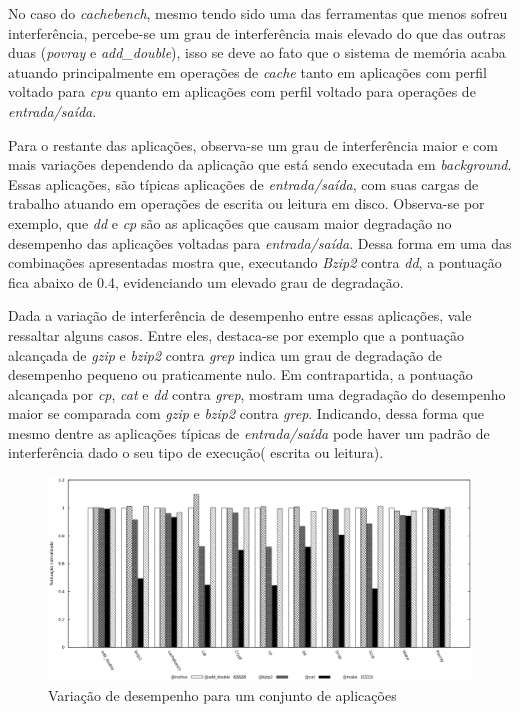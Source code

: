 No caso do \textit{cachebench}, mesmo tendo sido uma das ferramentas que menos sofreu interferência, percebe-se um grau de interferência mais elevado do que das outras duas (\textit{povray} e \textit{add\_double}), isso se deve ao fato que o sistema de memória acaba atuando principalmente em operações de \textit{cache} tanto em aplicações com perfil voltado para \textit{cpu} quanto em aplicações com perfil voltado para operações de \textit{entrada/saída}.

Para o restante das aplicações, observa-se um grau de interferência maior e com mais variações dependendo da aplicação que está sendo executada em \textit{background}. Essas aplicações, são típicas aplicações de \textit{entrada/saída}, com suas cargas de trabalho atuando em operações de escrita ou leitura em disco. Observa-se por exemplo, que \textit{dd} e \textit{cp} são as aplicações que causam maior degradação no desempenho das aplicações voltadas para \textit{entrada/saída}. Dessa forma  em uma das combinações apresentadas mostra que, executando \textit{Bzip2} contra \textit{dd}, a pontuação fica abaixo de 0.4, evidenciando um elevado grau de degradação.

Dada a variação de interferência de desempenho entre essas aplicações, vale ressaltar alguns casos. Entre eles, destaca-se por exemplo que a pontuação alcançada de \textit{gzip} e \textit{bzip2} contra \textit{grep} indica um grau de degradação de desempenho pequeno ou praticamente nulo. Em contrapartida, a pontuação alcançada por \textit{cp}, \textit{cat} e \textit{dd} contra \textit{grep}, mostram uma degradação do desempenho maior se comparada com \textit{gzip} e \textit{bzip2} contra \textit{grep}. Indicando, dessa forma que mesmo dentre as aplicações típicas de \textit{entrada/saída} pode haver um padrão de interferência dado o seu tipo de execução( escrita ou leitura). 

\begin{figure}[!h]
\centering
\includegraphics [keepaspectratio=true,scale=0.45]{graficos/exp_2_1_foreground.eps}
\caption{Variação de desempenho para um conjunto de aplicações}
\label{second_experiment_second}
\end{figure} 

